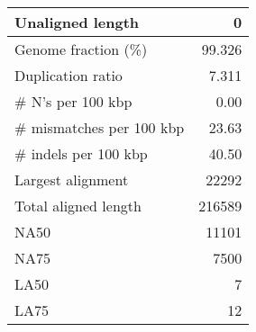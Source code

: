 \documentclass[12pt,a4paper]{article}
\begin{document}
\begin{table}[ht]
\begin{center}
\begin{tabular}{|l*{1}{|r}|}
Unaligned length & 0 \\ \hline
Genome fraction (\%) & 99.326 \\ \hline
Duplication ratio & 7.311 \\ \hline
\# N's per 100 kbp & 0.00 \\ \hline
\# mismatches per 100 kbp & 23.63 \\ \hline
\# indels per 100 kbp & 40.50 \\ \hline
Largest alignment & 22292 \\ \hline
Total aligned length & 216589 \\ \hline
NA50 & 11101 \\ \hline
NA75 & 7500 \\ \hline
LA50 & 7 \\ \hline
LA75 & 12 \\ \hline
\end{tabular}
\end{center}
\end{table}
\end{document}
